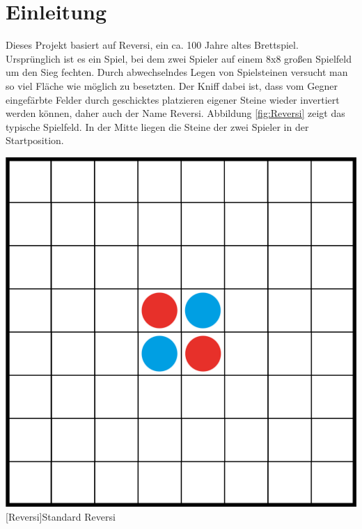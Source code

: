 \documentclass[12pt,a4paper,bibliography=totocnumbered,listof=totocnumbered]{scrartcl}
\begin{document}
    \section{Einleitung}
    \vspace{1em}

		
    Dieses Projekt basiert auf Reversi, ein ca. 100 Jahre altes Brettspiel. Ursprünglich ist es ein Spiel, bei dem zwei Spieler auf einem 8x8 großen Spielfeld um den Sieg fechten. Durch abwechselndes Legen von Spielsteinen versucht man so viel Fläche wie möglich zu besetzten. Der Kniff dabei ist, dass vom Gegner eingefärbte Felder durch geschicktes platzieren eigener Steine wieder invertiert werden können, daher auch der Name Reversi. Abbildung \ref{fig:Reversi} zeigt das typische Spielfeld. In der Mitte liegen die Steine der zwei Spieler in der Startposition.
    
    \vspace{1em}
    \begin{minipage}{\linewidth}
    	\centering
    	\includegraphics[width=0.4\linewidth]{pics/Kapitel_1/Kapitel_1_pic1.png}
    	[Reversi]{\glqq Standard\grqq{} Reversi }
    	\label{fig:Reversi}
    \end{minipage}
    \vspace{1em}
    
\end{document}
